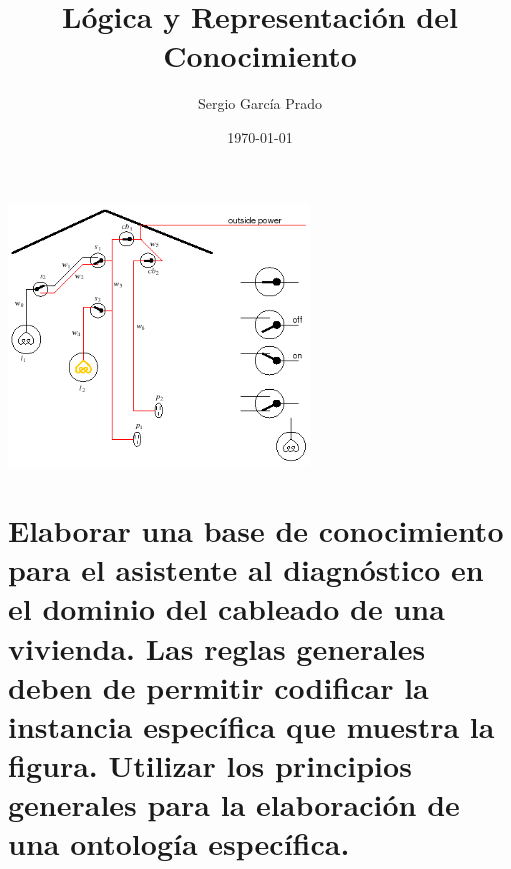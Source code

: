 \documentclass[10pt, a4paper,spanish]{article}
\title{\vspace{-15mm}\fontsize{24pt}{10pt}\selectfont\textbf{Lógica y Representación del Conocimiento}} %
\author{Sergio García Prado}
\date{\today}
\begin{document}
	\maketitle %

	\thispagestyle{fancy} %


	\begin{center}
		\includegraphics[width=0.6\textwidth]{diagnostic-assistant}
	\end{center}

	\section{Elaborar una base de conocimiento para el asistente al diagnóstico en el dominio del cableado de una vivienda. Las reglas generales deben de permitir codificar la instancia específica que muestra la figura. Utilizar los principios generales para la elaboración de una ontología específica.}
\end{document}
